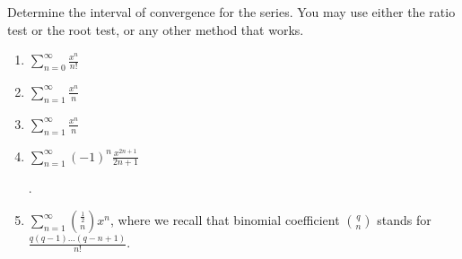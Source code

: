 Determine the interval of convergence for the series. You may use either the ratio test or the root test, or any other method that works.
\begin{enumerate}
\item 
$\displaystyle \sum\limits_{n=0}^{\infty} \frac{x^n}{n!}$

\item 
$\displaystyle \sum\limits_{n=1}^{\infty} \frac{x^n}{n} $

\item 
$\displaystyle \sum\limits_{n=1}^{\infty} \frac{x^n}{n}$
\answer{converges for $|x|\in[-1,1)$.}
\item 
$\displaystyle\sum\limits_{n=1}^{\infty} (-1)^n\frac{x^{2n+1}}{2n+1}$

\answer{converges for $|x|\in (-1, 1]$}.
\item 
$\displaystyle \sum\limits_{n=1}^{\infty} \binom{\frac{1}{2}}{n}x^{n}$, where we recall that binomial coefficient $\displaystyle \binom{q}{n}$ stands for $\displaystyle\frac{q (q-1)\dots (q-n+1)}{n!}$.
\answer{converges for $x\in (-1,1]$. } 
\end{enumerate}